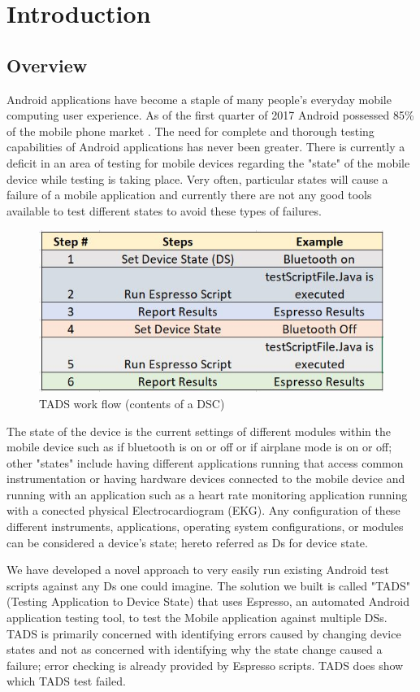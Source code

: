 \section{Introduction}
\subsection{Overview}
Android applications have become a staple of many people's everyday mobile computing user experience.  As of the first quarter of 2017 Android possessed 85\% of the mobile phone market \cite{chau_2017}.  The need for complete and thorough testing capabilities of Android applications has never been greater. There is currently a deficit in an area of testing for mobile devices regarding the "state" of the mobile device while testing is taking place. Very often, particular states will cause a failure of a mobile application and currently there are not any good tools available to test different states to avoid these types of failures.
\begin{figure}[t]
	\centering
	\caption[TADS work flow]{TADS work flow (contents of a DSC)}
	\label{fig:table1}
	\includegraphics[width=1\linewidth]{table1}
\end{figure}
The state of the device is the current settings of different modules within the mobile device such as if bluetooth is on or off or if airplane mode is on or off; other "states" include having different applications running that access common instrumentation or having hardware devices connected to the mobile device and running with an application such as a heart rate monitoring application running with a conected physical Electrocardiogram (EKG).  Any configuration of these different instruments, applications, operating system configurations, or modules can be considered a device's state; hereto referred as Ds for device state.

We have developed a novel approach to very easily run existing Android test scripts against any Ds one could imagine.  The solution we built is called "TADS" (Testing Application to Device State) that uses Espresso, an automated Android application testing tool, to test the Mobile application against multiple DSs.  TADS is primarily concerned with identifying errors caused by changing device states and not as concerned with identifying why the state change caused a failure; error checking is already provided by Espresso scripts.  TADS does show which TADS test failed.

